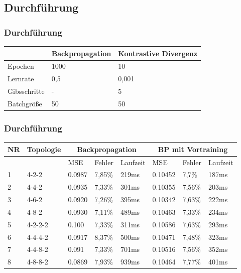 \documentclass[12pt,titlepage]{beamer}
\begin{document}
	\subsection{Durchführung}
	\begin{frame}
	\frametitle{Durchführung}
	\begin{table}[H]
\center
\begin{tabularx}{\textwidth}{|X|X|X|}
&Backpropagation & Kontrastive Divergenz\\\hline
Epochen&1000&10\\\hline
Lernrate&0,5&0,001\\\hline
Gibsschritte& - &5\\\hline
Batchgröße& 50 &50\\\hline
\end{tabularx}
\end{table}
	\end{frame}
	\begin{frame}
	\frametitle{Durchführung}
	\scriptsize
	\begin{tabularx}{\textwidth}{|X|X|X|X|X|X|X|X|}
	\hline
	NR & Topologie & \multicolumn{3}{|c|}{Backpropagation} & \multicolumn{3}{|c|}{BP mit Vortraining} \\\hline
	&&MSE& Fehler&Laufzeit&MSE& Fehler&Laufzeit
	\\\hline
	1&4-2-2&0.0987&7,85\%&219ms&0.10452&7,7\%&187ms\\\hline
	2&4-4-2&0.0935&7,33\%&301ms&0.10355&7,56\%&203ms\\\hline
	3&4-6-2&0.0920&7,26\%&395ms&0.10342&7,63\%&222ms\\\hline
	4&4-8-2&0.0930&7,11\%&489ms&0.10463&7,33\%&234ms\\\hline
	5&4-2-2-2&0.100&7,33\%&311ms&0.10586&7,63\%&293ms\\\hline
	6&4-4-4-2&0.0917&8,37\%&500ms&0.10471&7,48\%&323ms\\\hline
	7&4-4-8-2&0.091&7,33\%&701ms&0.10516&7,56\%&352ms\\\hline
	8&4-8-8-2&0.0869&7,93\%&939ms&0.10464&7,77\%&401ms\\\hline
	\end{tabularx}


	\end{frame}
\end{document}
